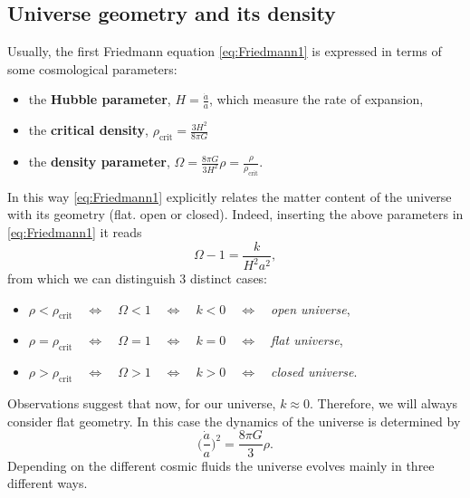 \subsection{Universe geometry and its density}
Usually, the first Friedmann equation \eqref{eq:Friedmann1} is expressed in terms of some cosmological parameters:
\begin{itemize}
    \item the \textbf{Hubble parameter}, $H=\frac{\dot a}{a}$, which measure the rate of expansion,
    \item the \textbf{critical density}, $\rho_{\text{crit}}=\frac{3H^2}{8\pi G}$
    \item the \textbf{density parameter}, $\Omega=\frac{8\pi G}{3H^2}\rho=\frac{\rho}{\rho_{\text{crit}}}$.
\end{itemize}
In this way \eqref{eq:Friedmann1} explicitly relates the matter content of the universe with its geometry (flat. open or closed). Indeed, inserting the above parameters in \eqref{eq:Friedmann1} it reads
\begin{equation}
    \boxed{\Omega-1=\frac{k}{H^2a^2}},
\end{equation}
from which we can distinguish 3 distinct cases:
\begin{itemize}
    \item $\rho<\rho_{\text{crit}}\quad\Leftrightarrow\quad \Omega<1 \quad\Leftrightarrow\quad k<0 \quad\Leftrightarrow\quad $\emph{open universe},
    \item  $\rho=\rho_{\text{crit}}\quad\Leftrightarrow\quad \Omega=1 \quad\Leftrightarrow\quad k=0 \quad\Leftrightarrow\quad $\emph{flat universe},
    \item  $\rho>\rho_{\text{crit}}\quad\Leftrightarrow\quad \Omega>1 \quad\Leftrightarrow\quad k>0 \quad\Leftrightarrow\quad $\emph{closed universe}.
\end{itemize} 
Observations suggest that now, for our universe, $k\approx0$. Therefore, we will always consider flat geometry. In this case the dynamics of the universe is determined by $$\bigg(\frac{\dot a }{a}\bigg)^2=\frac{8\pi G}{3}\rho. $$\pagebreak
Depending on the different cosmic fluids the universe evolves mainly in three different ways.
